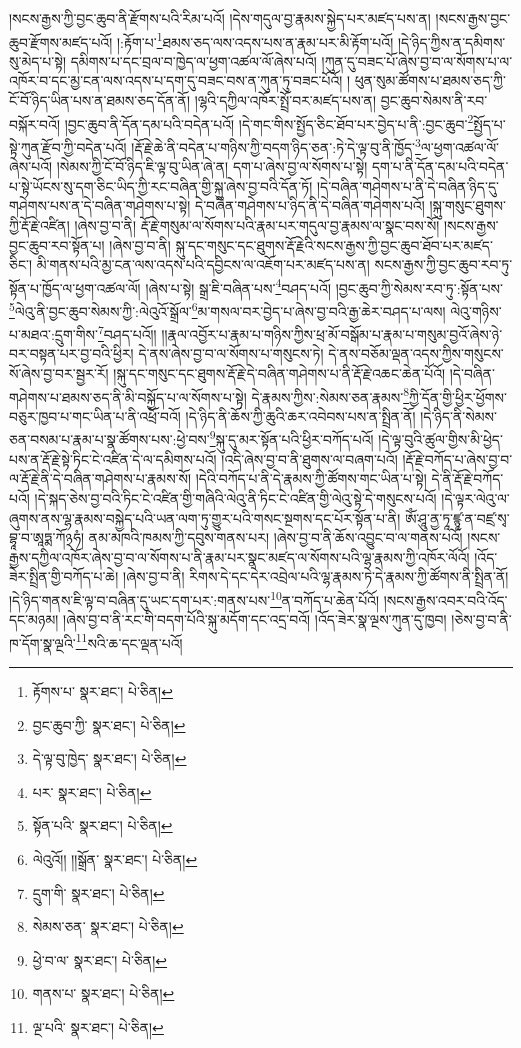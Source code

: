 །སངས་རྒྱས་ཀྱི་བྱང་ཆུབ་ནི་རྫོགས་པའི་རིམ་པའོ། །དེས་གདུལ་བྱ་རྣམས་སྐྱེད་པར་མཛད་པས་ན། །སངས་རྒྱས་བྱང་ཆུབ་རྫོགས་མཛད་པའོ། །:རྟོག་པ་\footnote{རྟོགས་པ་  སྣར་ཐང་།  པེ་ཅིན། }ཐམས་ཅད་ལས་འདས་པས་ན་རྣམ་པར་མི་རྟོག་པའོ། །དེ་ཉིད་ཀྱིས་ན་དམིགས་སུ་མེད་པ་སྟེ། དམིགས་པ་དང་བྲལ་བ་ཁྱེད་ལ་ཕྱག་འཚལ་ལོ་ཞེས་པའོ། །ཀུན་དུ་བཟང་པོ་ཞེས་བྱ་བ་ལ་སོགས་པ་ལ་འཁོར་བ་དང་མྱ་ངན་ལས་འདས་པ་དག་དུ་བཟང་བས་ན་ཀུན་ཏུ་བཟང་པོའོ། །
ཕུན་སུམ་ཚོགས་པ་ཐམས་ཅད་ཀྱི་ངོ་བོ་ཉིད་ཡིན་པས་ན་ཐམས་ཅད་དོན་ནོ། །ལྷའི་དཀྱིལ་འཁོར་སྤྲོ་བར་མཛད་པས་ན། བྱང་ཆུབ་སེམས་ནི་རབ་བསྐོར་བའོ། །བྱང་ཆུབ་ནི་དོན་དམ་པའི་བདེན་པའོ། །དེ་གང་གིས་སྤྱོད་ཅིང་ཐོབ་པར་བྱེད་པ་ནི་:བྱང་ཆུབ་\footnote{བྱང་ཆུབ་ཀྱི་  སྣར་ཐང་།  པེ་ཅིན། }སྤྱོད་པ་སྟེ་ཀུན་རྫོབ་ཀྱི་བདེན་པའོ། །རྡོ་རྗེ་ཆེ་ནི་བདེན་པ་གཉིས་ཀྱི་བདག་ཉིད་ཅན་:ཏེ་དེ་ལྟ་བུ་ནི་ཁྱོད་\footnote{དེ་ལྟ་བུ་ཁྱེད་  སྣར་ཐང་།  པེ་ཅིན། }ལ་ཕྱག་འཚལ་ལོ་ཞེས་པའོ། །སེམས་ཀྱི་ངོ་བོ་ཉིད་ཇི་ལྟ་བུ་ཡིན་ཞེ་ན། དག་པ་ཞེས་བྱ་ལ་སོགས་པ་སྟེ། དག་པ་ནི་དོན་དམ་པའི་བདེན་པ་སྟེ་ཡོངས་སུ་དག་ཅིང་ཡིད་ཀྱི་རང་བཞིན་གྱི་སྐུ་ཞེས་བྱ་བའི་དོན་ཏོ། །དེ་བཞིན་གཤེགས་པ་ནི་དེ་བཞིན་ཉིད་དུ་གཤེགས་པས་ན་དེ་བཞིན་གཤེགས་པ་སྟེ། དེ་བཞིན་གཤེགས་པ་ཉིད་ནི་དེ་བཞིན་གཤེགས་པའོ། །སྐུ་གསུང་ཐུགས་ཀྱི་རྡོ་རྗེ་འཛིན། །ཞེས་བྱ་བ་ནི། རྡོ་རྗེ་གསུམ་ལ་སོགས་པའི་རྣམ་པར་གདུལ་བྱ་རྣམས་ལ་སྣང་བས་སོ། །སངས་རྒྱས་བྱང་ཆུབ་རབ་སྟོན་པ། །ཞེས་བྱ་བ་ནི། སྐུ་དང་གསུང་དང་ཐུགས་རྡོ་རྗེའི་སངས་རྒྱས་ཀྱི་བྱང་ཆུབ་ཐོབ་པར་མཛད་ཅིང་། མི་གནས་པའི་མྱ་ངན་ལས་འདས་པའི་དབྱིངས་ལ་འཇོག་པར་མཛད་པས་ན། སངས་རྒྱས་ཀྱི་བྱང་ཆུབ་རབ་ཏུ་སྟོན་པ་ཁྱོད་ལ་ཕྱག་འཚལ་ལོ། །ཞེས་པ་སྟེ། སྒྲ་ཇི་བཞིན་པས་\footnote{པར་  སྣར་ཐང་།  པེ་ཅིན། }བཤད་པའོ། །བྱང་ཆུབ་ཀྱི་སེམས་རབ་ཏུ་:སྟོན་པས་\footnote{སྟོན་པའི་  སྣར་ཐང་།  པེ་ཅིན། }ལེའུ་ནི་བྱང་ཆུབ་སེམས་ཀྱི་:ལེའུའོ་སྒྲོལ་\footnote{ལེའུའོ།། །།སྒྲོན་  སྣར་ཐང་།  པེ་ཅིན། }མ་གསལ་བར་བྱེད་པ་ཞེས་བྱ་བའི་རྒྱ་ཆེར་བཤད་པ་ལས། ལེའུ་གཉིས་པ་མཐའ་:དྲུག་གིས་\footnote{དྲུག་གི་  སྣར་ཐང་།  པེ་ཅིན། }བཤད་པའོ།། །།རྣལ་འབྱོར་པ་རྣམ་པ་གཉིས་ཀྱིས་ཕྲ་མོ་བསྒོམ་པ་རྣམ་པ་གསུམ་བྱའོ་ཞེས་ཉེ་བར་བསྟན་པར་བྱ་བའི་ཕྱིར། དེ་ནས་ཞེས་བྱ་བ་ལ་སོགས་པ་གསུངས་ཏེ། དེ་ནས་བཅོམ་ལྡན་འདས་ཀྱིས་གསུངས་སོ་ཞེས་བྱ་བར་སྦྱར་རོ། །སྐུ་དང་གསུང་དང་ཐུགས་རྡོ་རྗེ་དེ་བཞིན་གཤེགས་པ་ནི་རྡོ་རྗེ་འཆང་ཆེན་པོའོ། །དེ་བཞིན་གཤེགས་པ་ཐམས་ཅད་ནི་མི་བསྐྱོད་པ་ལ་སོགས་པ་སྟེ། དེ་རྣམས་ཀྱིས་:སེམས་ཅན་རྣམས་\footnote{སེམས་ཅན་  སྣར་ཐང་།  པེ་ཅིན། }ཀྱི་དོན་གྱི་ཕྱིར་ཕྱོགས་བཅུར་ཁྱབ་པ་གང་ཡིན་པ་ནི་འཕྲོ་བའོ། །དེ་ཉིད་ནི་ཆོས་ཀྱི་ཆུའི་ཆར་འབེབས་པས་ན་སྤྲིན་ནོ། །དེ་ཉིད་ནི་སེམས་ཅན་བསམ་པ་རྣམ་པ་སྣ་ཚོགས་པས་:ཕྱེ་བས་\footnote{ཕྱེ་བ་ལ་  སྣར་ཐང་།  པེ་ཅིན། }སྐུ་དུ་མར་སྟོན་པའི་ཕྱིར་བཀོད་པའོ། །དེ་ལྟ་བུའི་ཚུལ་གྱིས་མི་ཕྱེད་པས་ན་རྡོ་རྗེ་སྟེ་ཏིང་ངེ་འཛིན་དེ་ལ་དམིགས་པའོ། །འདི་ཞེས་བྱ་བ་ནི་ཐུགས་ལ་བཞག་པའོ། །རྡོ་རྗེ་བཀོད་པ་ཞེས་བྱ་བ་ལ་རྡོ་རྗེ་ནི་དེ་བཞིན་གཤེགས་པ་རྣམས་སོ། །དེའི་བཀོད་པ་ནི་དེ་རྣམས་ཀྱི་ཚོགས་གང་ཡིན་པ་སྟེ། དེ་ནི་རྡོ་རྗེ་བཀོད་པའོ། །དེ་སྐད་ཅེས་བྱ་བའི་ཏིང་ངེ་འཛིན་གྱི་གཞིའི་ལེའུ་ནི་ཏིང་ངེ་འཛིན་གྱི་ལེའུ་སྟེ་དེ་གསུངས་པའོ། །དེ་ལྟར་ལེའུ་ལ་ཞུགས་ནས་ལྷ་རྣམས་བསྐྱེད་པའི་ཡན་ལག་ཏུ་གྱུར་པའི་གསང་སྔགས་དང་པོར་སྟོན་པ་ནི། ཨོཾ་ཤཱུ་ནྱ་ཏཱ་ཛྙཱ་ན་བཛྲ་སྭ་བྷཱ་བ་ཨཱཏྨ་ཀོ྅ཧཾ། ནམ་མཁའི་ཁམས་ཀྱི་དབུས་གནས་པར། །ཞེས་བྱ་བ་ནི་ཆོས་འབྱུང་བ་ལ་གནས་པའོ། །སངས་རྒྱས་དཀྱིལ་འཁོར་ཞེས་བྱ་བ་ལ་སོགས་པ་ནི་རྣམ་པར་སྣང་མཛད་ལ་སོགས་པའི་ལྷ་རྣམས་ཀྱི་འཁོར་ལོའོ། །འོད་ཟེར་སྤྲིན་གྱི་བཀོད་པ་ཆེ། །ཞེས་བྱ་བ་ནི། རིགས་དེ་དང་དེར་འབྲེལ་པའི་ལྷ་རྣམས་ཏེ་དེ་རྣམས་ཀྱི་ཚོགས་ནི་སྤྲིན་ནོ། །དེ་ཉིད་གནས་ཇི་ལྟ་བ་བཞིན་དུ་ཡང་དག་པར་:གནས་པས་\footnote{གནས་པ་  སྣར་ཐང་།  པེ་ཅིན། }ན་བཀོད་པ་ཆེན་པོའོ། །སངས་རྒྱས་འབར་བའི་འོད་དང་མཉམ། །ཞེས་བྱ་བ་ནི་རང་གི་བདག་པོའི་སྐུ་མདོག་དང་འདྲ་བའོ། །འོད་ཟེར་སྣ་ལྔས་ཀུན་དུ་ཁྱབ། །ཅེས་བྱ་བ་ནི་ཁ་དོག་སྣ་ལྔའི་\footnote{ལྔ་པའི་  སྣར་ཐང་།  པེ་ཅིན། }སའི་ཆ་དང་ལྡན་པའོ། 